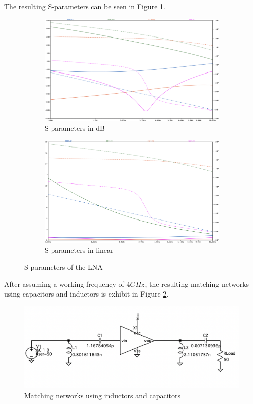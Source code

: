 The resulting S-parameters can be seen in Figure \ref{fig:SimS-param}.

\begin{figure}[H]
    \centering
    \begin{subfigure}{0.4\textwidth}
        \includegraphics[width=1\textwidth]{Images/S-paramdB.png}
        \caption{S-parameters in dB}
    \end{subfigure}
    \hfill
    \begin{subfigure}{0.4\textwidth}
        \includegraphics[width=1\textwidth]{Images/S-paramLin.png}
        \caption{S-parameters in linear}
    \end{subfigure}
    \caption{S-parameters of the LNA}
    \label{fig:SimS-param}
\end{figure}

After assuming a working frequency of $4 GHz$, the resulting matching networks using capacitors and inductors is exhibit in Figure \ref{fig:SIMLCMatchingCircuit}.

\begin{figure}[H]
    \centering
    \includegraphics*[scale = 0.3]{Images/SIMLCmatchingcircuit.png}
    \caption{Matching networks using inductors and capacitors}
    \label{fig:SIMLCMatchingCircuit}
\end{figure}

